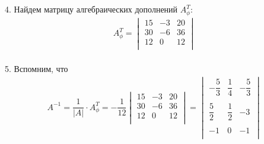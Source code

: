 \begin{enumerate}
\begin{gather*}
			\end{gather*}
			\\
			4. Найдем матрицу алгебраических дополнений $A_{\phi}^{T}:$
			\begin{gather*}
				A_{\phi}^{T} = 
				\begin{vmatrix}
					15 & -3 & 20\\
					30 & -6 & 36\\
					12 & 0 & 12\\
				\end{vmatrix} 
			\end{gather*}
			\\
			5. Вспомним, что 
			\begin{gather*}
				A^{-1} = \dfrac{1}{|A|} \cdot A_{\phi}^{T} = -\dfrac{1}{12} 
				\begin{vmatrix}
					15 & -3 & 20\\
					30 & -6 & 36\\
					12 & 0 & 12\\
				\end{vmatrix}
				 = 
				\begin{vmatrix}
					-\dfrac{5}{3} & \dfrac{1}{4} & -\dfrac{5}{3}\\
					\\
					\dfrac{5}{2} & \dfrac{1}{2} & -3\\
					\\
					-1 & 0 & -1\\
				\end{vmatrix} 
			\end{gather*}
		

\end{enumerate}
